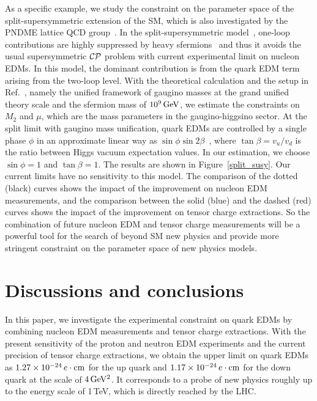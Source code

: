 \documentclass[aps,prd,twocolumn,groupedaddress,showpacs,superscriptaddress,floatfix,nofootinbib,10pt]{revtex4-1}
\begin{document}
As a specific example, we study the constraint on the parameter space of the split-supersymmetric extension of the SM, which is also investigated by the PNDME lattice QCD group~\cite{Bhattacharya:2015esa}. In the split-supersymmetric model~\cite{ArkaniHamed:2004fb}, one-loop contributions are highly suppressed by heavy sfermions~\cite{Giudice:2005rz,Li:2008kz} and thus it avoids the usual supersymmetric $\cal CP$ problem with current experimental limit on nucleon EDMs. In this model, the dominant contribution is from the quark EDM term arising from the two-loop level. With the theoretical calculation and the setup in Ref.~\cite{Giudice:2005rz}, namely the unified framework of gaugino masses at the grand unified theory scale and the sfermion mass of $10^9\,\rm GeV$, we estimate the constraints on $M_2$ and $\mu$, which are the mass parameters in the gaugino-higgsino sector. At the split limit with gaugino mass unification, quark EDMs are controlled by a single phase $\phi$ in an approximate linear way as $\sin\phi\sin2\beta$~\cite{Giudice:2005rz}, where $\tan\beta=v_u/v_d$ is the ratio between Higgs vacuum expectation values. In our estimation, we choose $\sin\phi=1$ and $\tan\beta=1$.  The results are shown in Figure~\ref{split_susy}. Our current limits have no sensitivity to this model. The comparison of the dotted (black) curves shows the impact of the improvement on nucleon EDM measurements, and the comparison between the solid (blue) and the dashed (red) curves shows the impact of the improvement on tensor charge extractions. So the combination of future nucleon EDM and tensor charge measurements will be a powerful tool for the search of beyond SM new physics and provide more stringent constraint on the parameter space of new physics models.

\section{Discussions and conclusions}

In this paper, we investigate the experimental constraint on quark EDMs by combining nucleon EDM measurements and tensor charge extractions. With the present sensitivity of the proton and neutron EDM experiments and the current precision of tensor charge extractions, we obtain the upper limit on quark EDMs as $1.27\times10^{-24}\,e\cdot{\rm cm}$ for the up quark and $1.17\times10^{-24}\,e\cdot{\rm cm}$ for the down quark at the scale of $4\,\rm GeV^2$. It corresponds to a probe of new physics roughly up to the energy scale of 1\,TeV, which is directly reached by the LHC. 
\end{document}
